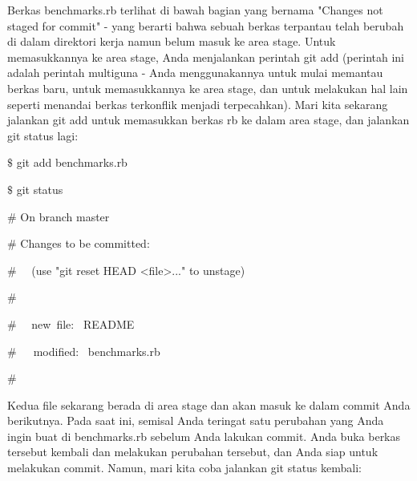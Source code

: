 \noindent 
{\fontsize{14pt}{14pt}\selectfont Berkas benchmarks.rb terlihat di bawah bagian yang bernama "Changes not staged for commit" - yang berarti bahwa sebuah berkas terpantau telah berubah di dalam direktori kerja namun belum masuk ke area stage. Untuk memasukkannya ke area stage, Anda menjalankan perintah $  $git add $  $(perintah ini adalah perintah multiguna - Anda menggunakannya untuk mulai memantau berkas baru, untuk memasukkannya ke area stage, dan untuk melakukan hal lain seperti menandai berkas terkonflik menjadi terpecahkan). Mari kita sekarang jalankan $  $git add $  $untuk memasukkan berkas rb ke dalam area stage, dan jalankan $  $git status $  $lagi: \\} \par
\noindent 
{\fontsize{14pt}{14pt}\selectfont  $  \$  $ git add benchmarks.rb \\} \par
\noindent 
{\fontsize{14pt}{14pt}\selectfont  $  \$  $ git status \\} \par
\noindent 
{\fontsize{14pt}{14pt}\selectfont  $  \#  $ On branch master \\} \par
\noindent 
{\fontsize{14pt}{14pt}\selectfont  $  \#  $ Changes to be committed: \\} \par
\noindent 
{\fontsize{14pt}{14pt}\selectfont  $  \#  $~~ (use "git reset HEAD <file>..." to unstage) \\} \par
\noindent 
{\fontsize{14pt}{14pt}\selectfont  $  \#  $ \\} \par
\noindent 
{\fontsize{14pt}{14pt}\selectfont  $  \#  $~~ new~file:~  README \\} \par
\noindent 
{\fontsize{14pt}{14pt}\selectfont  $  \#  $~~~modified:~  benchmarks.rb \\} \par
\noindent 
{\fontsize{14pt}{14pt}\selectfont  $  \#  $ \\} \par
\vspace{14pt}
\noindent 
{\fontsize{14pt}{14pt}\selectfont Kedua file sekarang berada di area stage dan akan masuk ke dalam commit Anda berikutnya. Pada saat ini, semisal Anda teringat satu perubahan yang Anda ingin buat di benchmarks.rb sebelum Anda lakukan commit. Anda buka berkas tersebut kembali dan melakukan perubahan tersebut, dan Anda siap untuk melakukan commit. Namun, mari kita coba jalankan $  $git status $  $kembali: \\} \par
